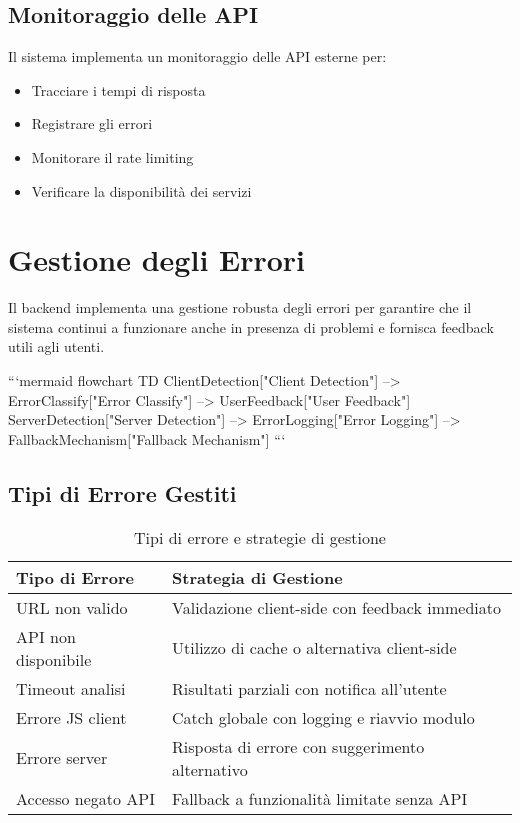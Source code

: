 \subsection{Monitoraggio delle API}
Il sistema implementa un monitoraggio delle API esterne per:
\begin{itemize}
    \item Tracciare i tempi di risposta
    \item Registrare gli errori
    \item Monitorare il rate limiting
    \item Verificare la disponibilità dei servizi
\end{itemize}

\section{Gestione degli Errori}
Il backend implementa una gestione robusta degli errori per garantire che il sistema continui a funzionare anche in presenza di problemi e fornisca feedback utili agli utenti.

```mermaid
flowchart TD
    ClientDetection["Client Detection"] --> ErrorClassify["Error Classify"] --> UserFeedback["User Feedback"]
    ServerDetection["Server Detection"] --> ErrorLogging["Error Logging"] --> FallbackMechanism["Fallback Mechanism"]
```


\subsection{Tipi di Errore Gestiti}
\begin{table}[H]
\centering
\begin{tabular}{|l|l|}
\hline
\textbf{Tipo di Errore} & \textbf{Strategia di Gestione} \\
\hline
URL non valido & Validazione client-side con feedback immediato \\
\hline
API non disponibile & Utilizzo di cache o alternativa client-side \\
\hline
Timeout analisi & Risultati parziali con notifica all'utente \\
\hline
Errore JS client & Catch globale con logging e riavvio modulo \\
\hline
Errore server & Risposta di errore con suggerimento alternativo \\
\hline
Accesso negato API & Fallback a funzionalità limitate senza API \\
\hline
\end{tabular}
\caption{Tipi di errore e strategie di gestione}
\label{table:error-handling}
\end{table}

